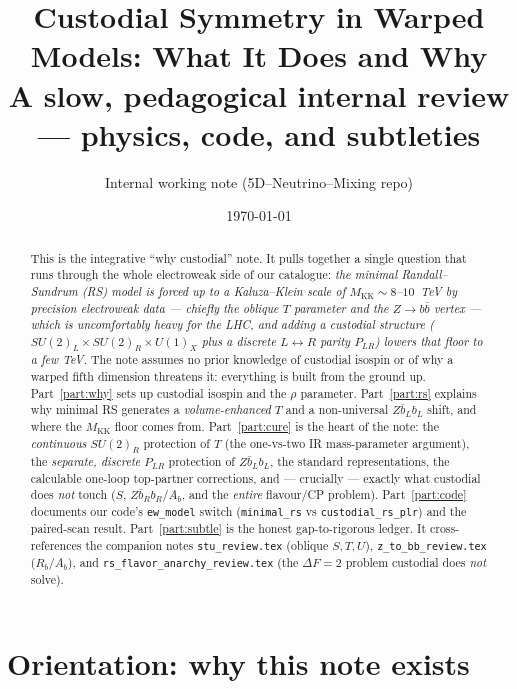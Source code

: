 \documentclass[11pt]{article}
\title{\bf Custodial Symmetry in Warped Models: What It Does and Why\\[4pt]
\large A slow, pedagogical internal review --- physics, code, and subtleties}
\author{Internal working note (5D--Neutrino--Mixing repo)}
\date{\today}
\newcommand{\MKK}{M_{\mathrm{KK}}}
\newcommand{\SUL}{SU(2)_L}
\newcommand{\SUR}{SU(2)_R}
\newcommand{\UX}{U(1)_X}
\newcommand{\PLR}{P_{LR}}
\newcommand{\code}[1]{\texttt{#1}}
\newcommand{\rhoparam}{\rho}
\theoremstyle{definition}
\begin{document}
\maketitle

\begin{abstract}
\noindent
This is the integrative ``why custodial'' note. It pulls together a single
question that runs through the whole electroweak side of our catalogue:
\emph{the minimal Randall--Sundrum (RS) model is forced up to a Kaluza--Klein
scale of $\MKK\sim 8$--$10$~TeV by precision electroweak data --- chiefly the
oblique $T$ parameter and the $Z\to b\bar b$ vertex --- which is uncomfortably
heavy for the LHC, and adding a custodial structure
($\SUL\times\SUR\times\UX$ plus a discrete $L\!\leftrightarrow\! R$ parity
$\PLR$) lowers that floor to a few TeV.} The note assumes no prior knowledge of
custodial isospin or of why a warped fifth dimension threatens it: everything is
built from the ground up. Part~\ref{part:why} sets up custodial isospin and the
$\rhoparam$ parameter. Part~\ref{part:rs} explains why minimal RS generates a
\emph{volume-enhanced} $T$ and a non-universal $Z\bar b_L b_L$ shift, and where
the $\MKK$ floor comes from. Part~\ref{part:cure} is the heart of the note: the
\emph{continuous} $\SUR$ protection of $T$ (the one-vs-two IR mass-parameter
argument), the \emph{separate, discrete} $\PLR$ protection of $Z\bar b_L b_L$,
the standard representations, the calculable one-loop top-partner corrections,
and --- crucially --- exactly what custodial does \emph{not} touch ($S$, $Z\bar
b_R b_R$/$A_b$, and the \emph{entire} flavour/CP problem). Part~\ref{part:code}
documents our code's \code{ew\_model} switch
(\code{minimal\_rs} vs \code{custodial\_rs\_plr}) and the paired-scan result.
Part~\ref{part:subtle} is the honest gap-to-rigorous ledger. It cross-references
the companion notes \code{stu\_review.tex} (oblique $S,T,U$),
\code{z\_to\_bb\_review.tex} ($R_b$/$A_b$), and
\code{rs\_flavor\_anarchy\_review.tex} (the $\Delta F=2$ problem custodial does
\emph{not} solve).
\end{abstract}

\tableofcontents

\part*{Orientation: why this note exists}
\end{document}
